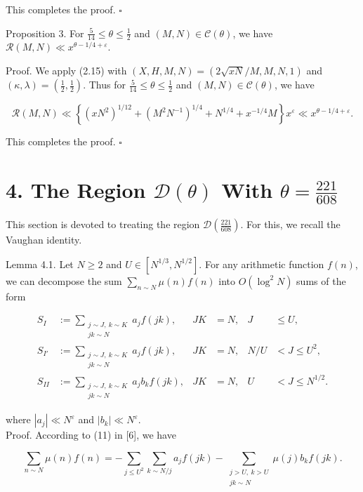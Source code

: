 \documentclass[10pt]{article}
\begin{document}
This completes the proof. \(\square\)

Proposition 3. For $\frac{5}{14} \leqslant \theta \leqslant \frac{1}{2}$ and $(M, N) \in \mathscr{C}(\theta)$, we have $\mathscr{R}(M, N) \ll x^{\theta-1 / 4+\varepsilon}$.

Proof. We apply (2.15) with $(X, H, M, N)=(2 \sqrt{x N} / M, M, N, 1)$ and $(\kappa, \lambda)=\left(\frac{1}{2}, \frac{1}{2}\right)$. Thus for $\frac{5}{14} \leqslant \theta \leqslant \frac{1}{2}$ and $(M, N) \in \mathscr{C}(\theta)$, we have

$$
\mathscr{R}(M, N) \ll\left\{\left(x N^{2}\right)^{1 / 12}+\left(M^{2} N^{-1}\right)^{1 / 4}+N^{1 / 4}+x^{-1 / 4} M\right\} x^{\varepsilon} \ll x^{\theta-1 / 4+\varepsilon} .
$$

This completes the proof. \(\square\)

\section*{4. The Region $\mathscr{D}(\theta)$ With $\theta=\frac{221}{608}$}
This section is devoted to treating the region $\mathscr{D}\left(\frac{221}{608}\right)$. For this, we recall the Vaughan identity.

Lemma 4.1. Let $N \geqslant 2$ and $U \in\left[N^{1 / 3}, N^{1 / 2}\right]$. For any arithmetic function $f(n)$, we can decompose the sum $\sum_{n \sim N} \mu(n) f(n)$ into $O\left(\log ^{2} N\right)$ sums of the form


\begin{align*}
S_I&:=\sum_{\substack{j\sim J,\ k\sim K\\jk\sim N}}a_jf(jk),
& JK&=N, & J&\leqslant U, \tag{I}\\
S_{I'}&:=\sum_{\substack{j\sim J,\ k\sim K\\jk\sim N}}a_jf(jk),
& JK&=N, & N/U&<J\leqslant U^2, \tag{I$'$}\\
S_{II}&:=\sum_{\substack{j\sim J,\ k\sim K\\jk\sim N}}a_jb_kf(jk),
& JK&=N, & U&<J\leqslant N^{1/2}. \tag{II}
\end{align*}

where $\left|a_{j}\right| \ll N^{\varepsilon}$ and $\left|b_{k}\right| \ll N^{\varepsilon}$.\\[0pt]
Proof. According to (11) in [6], we have


\begin{equation*}
\sum_{n\sim N}\mu(n)f(n)=-\sum_{j\leqslant U^2}\sum_{k\sim N/j}a_jf(jk)
-\sum_{\substack{j>U,\ k>U\\jk\sim N}}\mu(j)b_kf(jk).\tag{4.1}
\end{equation*}
\end{document}
